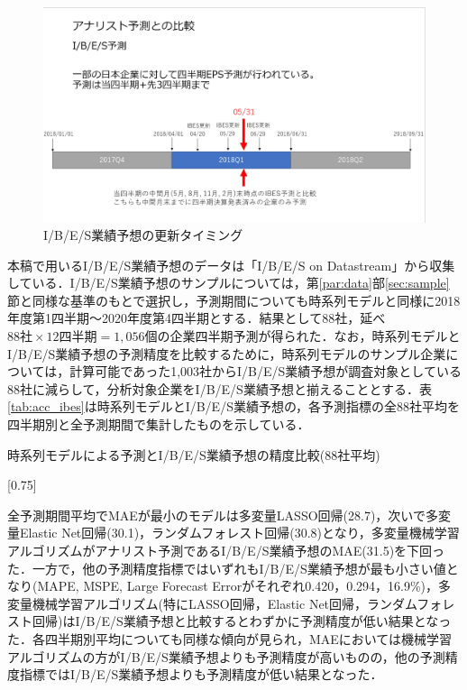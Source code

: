 \documentclass[a4paper，12pt]{jsarticle}
\begin{document}
\begin{figure}
  \centering
  \caption{I/B/E/S業績予想の更新タイミング}
  \label{fig:ibes_timing}
  \includegraphics[width=12cm]{./img/_ibes_timing.png}
\end{figure}

本稿で用いるI/B/E/S業績予想のデータは「I/B/E/S on Datastream」から収集している．I/B/E/S業績予想のサンプルについては，第\ref{par:data}部\ref{sec:sample}節と同様な基準のもとで選択し，予測期間についても時系列モデルと同様に2018年度第1四半期～2020年度第4四半期とする．結果として88社，延べ $88社 \times 12四半期 = 1,056個$の企業四半期予測が得られた．なお，時系列モデルとI/B/E/S業績予想の予測精度を比較するために，時系列モデルのサンプル企業については，計算可能であった1,003社からI/B/E/S業績予想が調査対象としている88社に減らして，分析対象企業をI/B/E/S業績予想と揃えることとする．表\ref{tab:acc_ibes}は時系列モデルとI/B/E/S業績予想の，各予測指標の全88社平均を四半期別と全予測期間で集計したものを示している．

\begin{landscape}
\begin{table}
    \caption{時系列モデルによる予測とI/B/E/S業績予想の精度比較(88社平均)}
    \label{tab:acc_ibes}
    \scalebox{0.75}[0.75]{
      
    }
\end{table}
\end{landscape}

全予測期間平均でMAEが最小のモデルは多変量LASSO回帰(28.7)，次いで多変量Elastic Net回帰(30.1)，ランダムフォレスト回帰(30.8)となり，多変量機械学習アルゴリズムがアナリスト予測であるI/B/E/S業績予想のMAE(31.5)を下回った．一方で，他の予測精度指標ではいずれもI/B/E/S業績予想が最も小さい値となり(MAPE, MSPE, Large Forecast Errorがそれぞれ0.420，0.294，16.9\%)，多変量機械学習アルゴリズム(特にLASSO回帰，Elastic Net回帰，ランダムフォレスト回帰)はI/B/E/S業績予想と比較するとわずかに予測精度が低い結果となった．各四半期別平均についても同様な傾向が見られ，MAEにおいては機械学習アルゴリズムの方がI/B/E/S業績予想よりも予測精度が高いものの，他の予測精度指標ではI/B/E/S業績予想よりも予測精度が低い結果となった．
\end{document}
